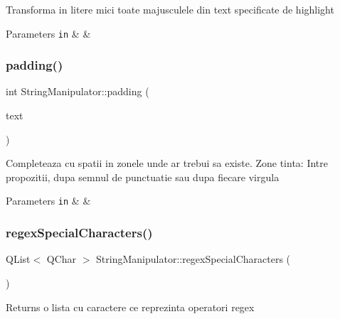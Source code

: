 Transforma in litere mici toate majusculele din text specificate de highlight


\begin{DoxyParams}[1]{Parameters}
\mbox{\tt in}  & {\em } & \\
\hline
\end{DoxyParams}
\mbox{\label{class_string_manipulator_ac669121dd3e5fda9b8723593fc7ca04d}} 
\subsubsection{\texorpdfstring{padding()}{padding()}}
{\footnotesize\ttfamily int String\+Manipulator\+::padding (\begin{DoxyParamCaption}\item[{Q\+String \&}]{text }\end{DoxyParamCaption})\hspace{0.3cm}{\ttfamily [static]}}

Completeaza cu spatii in zonele unde ar trebui sa existe. Zone tinta\+: Intre propozitii, dupa semnul de punctuatie sau dupa fiecare virgula


\begin{DoxyParams}[1]{Parameters}
\mbox{\tt in}  & {\em } & \\
\hline
\end{DoxyParams}
\mbox{\label{class_string_manipulator_a5ac671799b00b71f236dcfb68077cdce}} 
\subsubsection{\texorpdfstring{regex\+Special\+Characters()}{regexSpecialCharacters()}}
{\footnotesize\ttfamily Q\+List$<$ Q\+Char $>$ String\+Manipulator\+::regex\+Special\+Characters (\begin{DoxyParamCaption}{ }\end{DoxyParamCaption})\hspace{0.3cm}{\ttfamily [static]}}

\begin{DoxyReturn}{Returns}
o lista cu caractere ce reprezinta operatori regex 
\end{DoxyReturn}
\mbox{\label{class_string_manipulator_af2041957b6df343d55d1cd99719e0d16}} 
